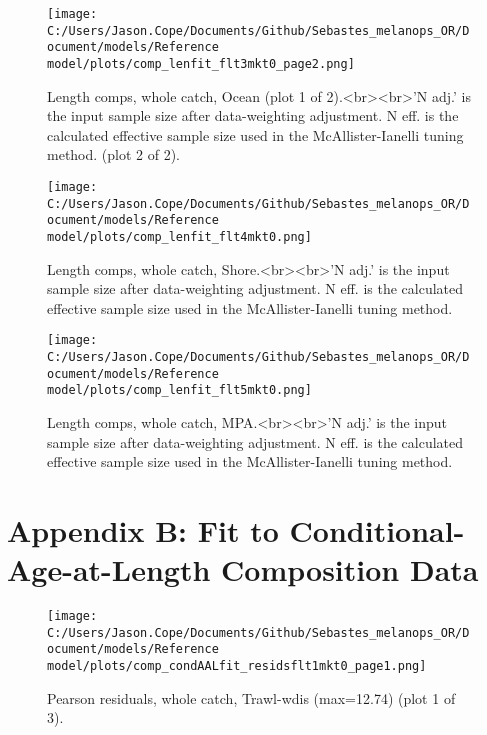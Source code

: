 \documentclass[11pt,
  letterpaper,
]{article}
\begin{document}
\begin{figure}
{\centering
\texttt{[image: C:/Users/Jason.Cope/Documents/Github/Sebastes\_melanops\_OR/Document/models/Reference model/plots/comp\_lenfit\_flt3mkt0\_page2.png]}
}
\caption{Length comps, whole catch, Ocean (plot 1 of 2).<br><br>'N adj.' is the input sample size after data-weighting adjustment. N eff. is the calculated effective sample size used in the McAllister-Ianelli tuning method. (plot 2 of 2).\label{fig:comp_lenfit_flt3mkt0_page2}}
\end{figure}

\begin{figure}
{\centering
\texttt{[image: C:/Users/Jason.Cope/Documents/Github/Sebastes\_melanops\_OR/Document/models/Reference model/plots/comp\_lenfit\_flt4mkt0.png]}
}
\caption{Length comps, whole catch, Shore.<br><br>'N adj.' is the input sample size after data-weighting adjustment. N eff. is the calculated effective sample size used in the McAllister-Ianelli tuning method.\label{fig:comp_lenfit_flt4mkt0}}
\end{figure}

\begin{figure}
{\centering
\texttt{[image: C:/Users/Jason.Cope/Documents/Github/Sebastes\_melanops\_OR/Document/models/Reference model/plots/comp\_lenfit\_flt5mkt0.png]}
}
\caption{Length comps, whole catch, MPA.<br><br>'N adj.' is the input sample size after data-weighting adjustment. N eff. is the calculated effective sample size used in the McAllister-Ianelli tuning method.\label{fig:comp_lenfit_flt5mkt0}}
\end{figure}

\clearpage

\hypertarget{app-b}{%
\section{Appendix B: Fit to Conditional-Age-at-Length Composition Data}\label{app-b}}

\begin{figure}
{\centering
\texttt{[image: C:/Users/Jason.Cope/Documents/Github/Sebastes\_melanops\_OR/Document/models/Reference model/plots/comp\_condAALfit\_residsflt1mkt0\_page1.png]}
}
\caption{Pearson residuals, whole catch, Trawl-wdis (max=12.74) (plot 1 of 3).\label{fig:comp_condAALfit_residsflt1mkt0_page1}}
\end{figure}
\end{document}
